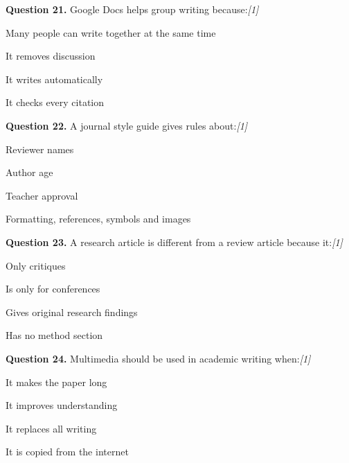 \documentclass[11pt,a4paper]{article}
\newcommand{\pts}[1]{\hfill   \textit{[#1]}}
\begin{document}
\medskip




\noindent   \textbf{Question 21.} Google Docs helps group writing because:\pts{1}

\begin{parts}
  \item Many people can write together at the same time
  \item It removes discussion
  \item It writes automatically
  \item It checks every citation
\end{parts}

\medskip




\noindent   \textbf{Question 22.} A journal style guide gives rules about:\pts{1}

\begin{parts}
  \item Reviewer names
  \item Author age
  \item Teacher approval
  \item Formatting, references, symbols and images
\end{parts}

\medskip




\noindent   \textbf{Question 23.} A research article is different from a review article because it:\pts{1}

\begin{parts}
  \item Only critiques
  \item Is only for conferences
  \item Gives original research findings
  \item Has no method section
\end{parts}

\medskip




\noindent   \textbf{Question 24.} Multimedia should be used in academic writing when:\pts{1}

\begin{parts}
  \item It makes the paper long
  \item It improves understanding
  \item It replaces all writing
  \item It is copied from the internet
\end{parts}
\end{document}
